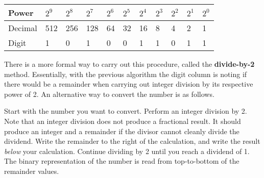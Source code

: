 \documentclass[11pt]{book}
\begin{document}
\vspace{1em}
\begin{tabular}{|l|l|l|l|l|l|l|l|l|l|l|}\hline
Power & $2^9$ & $2^8$ & $2^7$ & $2^6$ & $2^5$ & $2^4$ & $2^3$ & $2^2$ & $2^1$ & $2^0$ \\\hline\hline
Decimal & 512 & 256 & 128 & 64 & 32 & 16 & 8 & 4 & 2 & 1 \\\hline
Digit & 1 & 0 & 1 & 0 & 0 & 1 & 1 & 0 & 1 & 1 \\\hline
\end{tabular}

\vspace{1em}
There is a more formal way to carry out this procedure, called the \textbf{divide-by-2} method. Essentially, with the previous algorithm the digit column is noting if there would be a remainder when carrying out integer division by its respective power of 2. An alternative way to convert the number is as follows.

Start with the number you want to convert. Perform an integer division by 2. Note that an integer division does not produce a fractional result. It should produce an integer and a remainder if the divisor cannot cleanly divide the dividend. Write the remainder to the right of the calculation, and write the result \textit{below} your calculation. Continue dividing by 2 until you reach a dividend of 1. The binary representation of the number is read from top-to-bottom of the remainder values.


 
 
\end{document}
